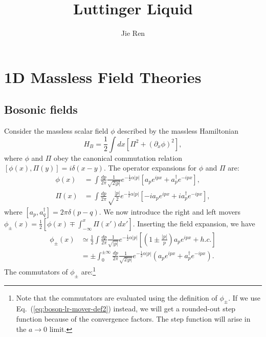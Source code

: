 \documentclass[aps,prb,superscriptaddress,nofootinbib]{revtex4}
\begin{document}
\title{Luttinger Liquid}
\author{Jie Ren}


\maketitle


\tableofcontents

\section{1D Massless Field Theories}

\subsection{Bosonic fields}

Consider the massless scalar field $\phi$ described by the massless Hamiltonian
\begin{equation}
	H_B = \frac{1}{2}\int dx[\Pi^2+(\partial_x\phi)^2],
\end{equation}
where $\phi$ and $\Pi$ obey the canonical commutation relation $[\phi(x),\Pi(y)] = i\delta(x-y)$.
The operator expansions for $\phi$ and $\Pi$ are:
\begin{equation}
\begin{aligned}
	\phi(x) &= \int \frac{dp}{2\pi} \frac{1}{\sqrt{2|p|}} e^{-\frac{1}{2}\alpha|p|} \left[a_p e^{ipx} + a_p^\dagger e^{-ipx} \right], \\
	\Pi(x) &= \int \frac{dp}{2\pi} \sqrt\frac{|p|}{2} e^{-\frac{1}{2}\alpha|p|} \left[-ia_p e^{ipx} + ia_p^\dagger e^{-ipx} \right],
\end{aligned}	
\end{equation}
where $[a_p,a_q^\dagger]=2\pi\delta(p-q)$.
We now introduce the right and left movers $\phi_\pm(x) = \frac{1}{2}[\phi(x)\mp\int_{-\infty}^x \Pi(x')dx']$.
Inserting the field expansion, we have
\begin{equation} \label{eq:boson-lr-mover-def2}
\begin{aligned}
	\phi_\pm(x)
	&\simeq \frac{1}{2} \int \frac{dp}{2\pi} \frac{1}{\sqrt{|p|}}e^{-\frac{1}{2}\alpha|p|}\left[\left(1\pm\frac{|p|}{p}\right)a_p e^{ipx}+h.c.\right] \\
	&= \pm\int_0^{\pm\infty} \frac{dp}{2\pi}\frac{1}{\sqrt{2|p|}}e^{-\frac{1}{2}\alpha|p|} \left(a_p e^{ipx} + a_p^\dagger e^{-ipx} \right).
\end{aligned}
\end{equation}
The commutators of $\phi_\pm$ are:\footnote{Note that the commutators are evaluated using the definition of $\phi_\pm$.
If we use Eq.~(\ref{eq:boson-lr-mover-def2}) instead, we will get a rounded-out step function because of the convergence factors.
The step function will arise in the $a\rightarrow 0$ limit.}
\end{document}
